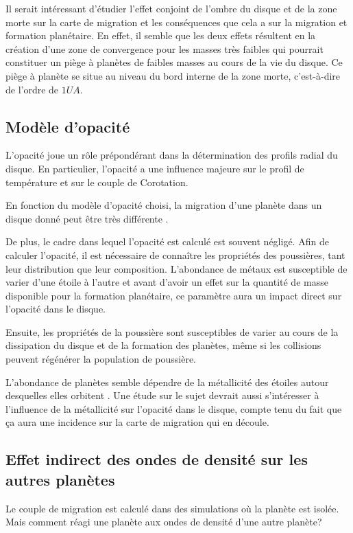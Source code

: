 Il serait intéressant d'étudier l'effet conjoint de l'ombre du disque et de la zone morte sur la carte de migration et les conséquences que cela a sur la migration et formation planétaire. En effet, il semble que les deux effets résultent en la création d'une zone de convergence pour les masses très faibles  qui pourrait constituer un piège à planètes de faibles masses au cours de la vie du disque. Ce piège à planète se situe au niveau du bord interne de la zone morte, c'est-à-dire de l'ordre de $1\unit{UA}$.

\subsection{Modèle d'opacité}
L'opacité joue un rôle prépondérant dans la détermination des profils radial du disque. En particulier, l'opacité a une influence majeure sur le profil de température et sur le couple de Corotation. 

En fonction du modèle d'opacité choisi, la migration d'une planète dans un disque donné peut être très différente . 

De plus, le cadre dans lequel l'opacité est calculé est souvent négligé. Afin de calculer l'opacité, il est nécessaire de connaître les propriétés des poussières, tant leur distribution que leur composition. L'abondance de métaux est susceptible de varier d'une étoile à l'autre et avant d'avoir un effet sur la quantité de masse disponible pour la formation planétaire, ce paramètre aura un impact direct sur l'opacité dans le disque. 

Ensuite, les propriétés de la poussière sont susceptibles de varier au cours de la dissipation du disque et de la formation des planètes, même si les collisions peuvent régénérer la population de poussière.

L'abondance de planètes semble dépendre de la métallicité des étoiles autour desquelles elles orbitent \citep{fischer2005planet}. Une étude sur le sujet devrait aussi s'intéresser à l'influence de la métallicité sur l'opacité dans le disque, compte tenu du fait que ça aura une incidence sur la carte de migration qui en découle.

\subsection{Effet indirect des ondes de densité sur les autres planètes}
Le couple de migration est calculé dans des simulations où la planète est isolée. Mais comment réagi une planète aux ondes de densité d'une autre planète? 

